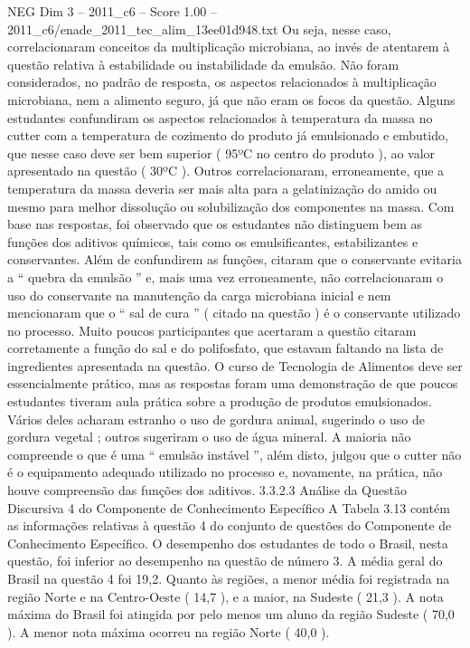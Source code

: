 \begin{textsample}{NEG Dim 3 – 2011\_c6 – Score 1.00 – 2011\_c6/enade\_2011\_tec\_alim\_13ee01d948.txt}
Ou seja, nesse caso, correlacionaram conceitos da multiplicação microbiana, ao invés de atentarem à questão relativa à estabilidade ou instabilidade da emulsão.
Não foram considerados, no padrão de resposta, os aspectos relacionados à multiplicação microbiana, nem a alimento seguro, já que não eram os focos da questão.
Alguns estudantes confundiram os aspectos relacionados à temperatura da massa no cutter com a temperatura de cozimento do produto já emulsionado e embutido, que nesse caso deve ser bem superior ( 95ºC no centro do produto ), ao valor apresentado na questão ( 30ºC ).
Outros correlacionaram, erroneamente, que a temperatura da massa deveria ser mais alta para a gelatinização do amido ou mesmo para melhor dissolução ou solubilização dos componentes na massa.
Com base nas respostas, foi observado que os estudantes não distinguem bem as funções dos aditivos químicos, tais como os emulsificantes, estabilizantes e conservantes.
Além de confundirem as funções, citaram que o conservante evitaria a “ quebra da emulsão ” e, mais uma vez erroneamente, não correlacionaram o uso do conservante na manutenção da carga microbiana inicial e nem mencionaram que o “ sal de cura ” ( citado na questão ) é o conservante utilizado no processo.
Muito poucos participantes que acertaram a questão citaram corretamente a função do sal e do polifosfato, que estavam faltando na lista de ingredientes apresentada na questão.
O curso de Tecnologia de Alimentos deve ser essencialmente prático, mas as respostas foram uma demonstração de que poucos estudantes tiveram aula prática sobre a produção de produtos emulsionados.
Vários deles acharam estranho o uso de gordura animal, sugerindo o uso de gordura vegetal ; outros sugeriram o uso de água mineral.
A maioria não compreende o que é uma “ emulsão instável ”, além disto, julgou que o cutter não é o equipamento adequado utilizado no processo e, novamente, na prática, não houve compreensão das funções dos aditivos. 3.3.2.3 Análise da Questão Discursiva 4 do Componente de Conhecimento Específico A Tabela 3.13 contém as informações relativas à questão 4 do conjunto de questões do Componente de Conhecimento Específico.
O desempenho dos estudantes de todo o Brasil, nesta questão, foi inferior ao desempenho na questão de número 3.
A média geral do Brasil na questão 4 foi 19,2.
Quanto às regiões, a menor média foi registrada na região Norte e na Centro-Oeste ( 14,7 ), e a maior, na Sudeste ( 21,3 ).
A nota máxima do Brasil foi atingida por pelo menos um aluno da região Sudeste ( 70,0 ).
A menor nota máxima ocorreu na região Norte ( 40,0 ).

\end{textsample}
